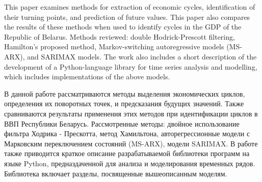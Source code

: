 \documentclass[a4paper,14pt]{extreport}
\begin{document}
	\maketitle
	

	\clearpage
	
	\renewcommand{\contentsname}{Содержание}
	\tableofcontents
	
	\clearpage
	
	\bsuabstract
	{
		This paper examines methods for extraction of economic cycles, identification of their turning points, and prediction of future values. This paper also compares the results of these methods when used to identify cycles in the GDP of the Republic of Belarus. Methods reviewed: double Hodrick-Prescott filtering, Hamilton's proposed method,  Markov-switching autoregressive models (MS-ARX), and SARIMAX models. The work also includes a short description of the development of a Python-language library for time series analysis and modelling, which includes implementations of the above models.
		
	}{
		В данной работе рассматриваются методы выделения экономических циклов, определения их поворотных точек, и предсказания будущих значений. Также сравниваются результаты применения этих методов при идентификации циклов в ВВП Республики Беларусь. Рассмотренные методы: двойное использование фильтра Ходрика - Прескотта, метод Хамильтона, авторегрессионные модели с Марковским переключением состояний (MS-ARX), модели SARIMAX. В работе также приводится краткое описание разрабатываемой библиотеки программ на языке Python, предназдаченной для анализа и моделирования временных рядов. Библиотека включает разделы, посвященные вышеописанным моделям.
	}
	
	\clearpage
			
	
	
	\clearpage
	
\end{document}
